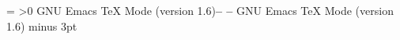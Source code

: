 %


\def\version{version 1.6}
\def\versiondate{February 1, 1987}
\headline={
   \ifnum\pageno>0
      \ifodd\pageno
           {\ssl GNU Emacs {\TeX} Mode (\version)}\hfill{\hss\bf -- \folio\/ --}
      \else {\bf -- \folio\/ --}\hfill{\hss\ssl GNU Emacs {\TeX} Mode (\version)}
      \fi
   \else\hfill
   \fi}
\parindent=2pc
\parskip=8pt minus 3pt
\nopagenumbers

